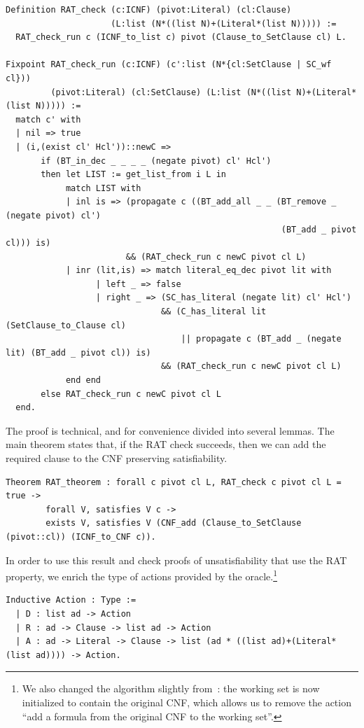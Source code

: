 \documentclass{article}
\begin{document}
\begin{lstlisting}
Definition RAT_check (c:ICNF) (pivot:Literal) (cl:Clause)
                     (L:list (N*((list N)+(Literal*(list N))))) :=
  RAT_check_run c (ICNF_to_list c) pivot (Clause_to_SetClause cl) L.

Fixpoint RAT_check_run (c:ICNF) (c':list (N*{cl:SetClause | SC_wf cl}))
         (pivot:Literal) (cl:SetClause) (L:list (N*((list N)+(Literal*(list N))))) :=
  match c' with
  | nil => true
  | (i,(exist cl' Hcl'))::newC =>
       if (BT_in_dec _ _ _ _ (negate pivot) cl' Hcl')
       then let LIST := get_list_from i L in
            match LIST with
            | inl is => (propagate c ((BT_add_all _ _ (BT_remove _ (negate pivot) cl')
                                                       (BT_add _ pivot cl))) is)
                        && (RAT_check_run c newC pivot cl L)
            | inr (lit,is) => match literal_eq_dec pivot lit with
                  | left _ => false
                  | right _ => (SC_has_literal (negate lit) cl' Hcl')
                               && (C_has_literal lit (SetClause_to_Clause cl)
                                   || propagate c (BT_add _ (negate lit) (BT_add _ pivot cl)) is)
                               && (RAT_check_run c newC pivot cl L)
            end end
       else RAT_check_run c newC pivot cl L
  end.
\end{lstlisting}

The proof is technical, and for convenience divided into several lemmas.
The main theorem states that, if the RAT check succeeds, then we can add the required clause to the CNF preserving
satisfiability.

\begin{lstlisting}
Theorem RAT_theorem : forall c pivot cl L, RAT_check c pivot cl L = true -> 
        forall V, satisfies V c ->
        exists V, satisfies V (CNF_add (Clause_to_SetClause (pivot::cl)) (ICNF_to_CNF c)).
\end{lstlisting}

In order to use this result and check proofs of unsatisfiability that use the RAT property, we enrich the type of
actions provided by the oracle.\footnote{We also changed the algorithm slightly from~\cite{grit}: the working set is now
initialized to contain the original CNF, which allows us to remove the action ``add a formula from the original CNF to
the working set''.}

\begin{lstlisting}
Inductive Action : Type :=
  | D : list ad -> Action
  | R : ad -> Clause -> list ad -> Action
  | A : ad -> Literal -> Clause -> list (ad * ((list ad)+(Literal*(list ad)))) -> Action.
\end{lstlisting}
\end{document}
